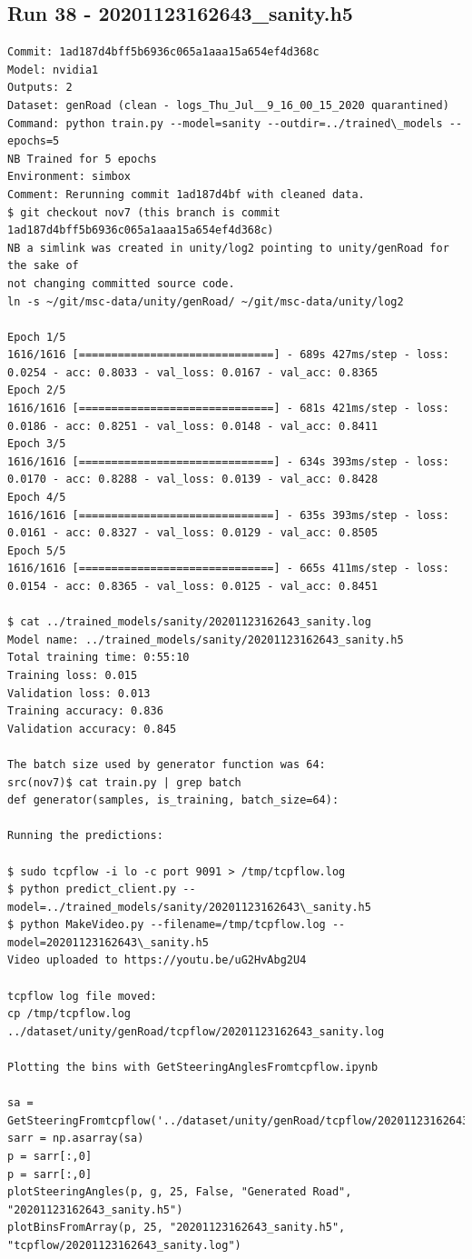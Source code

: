 \subsection{Run 38 - 20201123162643\_sanity.h5}
\begin{verbatim}
Commit: 1ad187d4bff5b6936c065a1aaa15a654ef4d368c
Model: nvidia1
Outputs: 2
Dataset: genRoad (clean - logs_Thu_Jul__9_16_00_15_2020 quarantined)
Command: python train.py --model=sanity --outdir=../trained\_models --epochs=5
NB Trained for 5 epochs
Environment: simbox
Comment: Rerunning commit 1ad187d4bf with cleaned data.
$ git checkout nov7 (this branch is commit 1ad187d4bff5b6936c065a1aaa15a654ef4d368c)
NB a simlink was created in unity/log2 pointing to unity/genRoad for the sake of
not changing committed source code.
ln -s ~/git/msc-data/unity/genRoad/ ~/git/msc-data/unity/log2

Epoch 1/5
1616/1616 [==============================] - 689s 427ms/step - loss: 0.0254 - acc: 0.8033 - val_loss: 0.0167 - val_acc: 0.8365
Epoch 2/5
1616/1616 [==============================] - 681s 421ms/step - loss: 0.0186 - acc: 0.8251 - val_loss: 0.0148 - val_acc: 0.8411
Epoch 3/5
1616/1616 [==============================] - 634s 393ms/step - loss: 0.0170 - acc: 0.8288 - val_loss: 0.0139 - val_acc: 0.8428
Epoch 4/5
1616/1616 [==============================] - 635s 393ms/step - loss: 0.0161 - acc: 0.8327 - val_loss: 0.0129 - val_acc: 0.8505
Epoch 5/5
1616/1616 [==============================] - 665s 411ms/step - loss: 0.0154 - acc: 0.8365 - val_loss: 0.0125 - val_acc: 0.8451

$ cat ../trained_models/sanity/20201123162643_sanity.log
Model name: ../trained_models/sanity/20201123162643_sanity.h5
Total training time: 0:55:10
Training loss: 0.015
Validation loss: 0.013
Training accuracy: 0.836
Validation accuracy: 0.845

The batch size used by generator function was 64:
src(nov7)$ cat train.py | grep batch
def generator(samples, is_training, batch_size=64):

Running the predictions:

$ sudo tcpflow -i lo -c port 9091 > /tmp/tcpflow.log
$ python predict_client.py --model=../trained_models/sanity/20201123162643\_sanity.h5
$ python MakeVideo.py --filename=/tmp/tcpflow.log --model=20201123162643\_sanity.h5
Video uploaded to https://youtu.be/uG2HvAbg2U4

tcpflow log file moved:
cp /tmp/tcpflow.log ../dataset/unity/genRoad/tcpflow/20201123162643_sanity.log

Plotting the bins with GetSteeringAnglesFromtcpflow.ipynb

sa = GetSteeringFromtcpflow('../dataset/unity/genRoad/tcpflow/20201123162643_sanity.log')
sarr = np.asarray(sa)
p = sarr[:,0]
p = sarr[:,0]  
plotSteeringAngles(p, g, 25, False, "Generated Road", "20201123162643_sanity.h5")
plotBinsFromArray(p, 25, "20201123162643_sanity.h5", "tcpflow/20201123162643_sanity.log") 
\end{verbatim}

